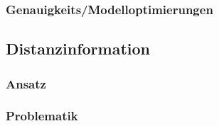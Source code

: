 			\subsubsection{Genauigkeits/Modelloptimierungen}
		
		\subsection{Distanzinformation}
			\subsubsection{Ansatz}
			\subsubsection{Problematik}
		        
      


